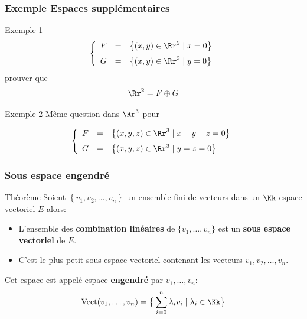 \documentclass[dvipsnames]{beamer}
\begin{document}
\begin{frame}[<+->]
  \frametitle{Exemple Espaces supplémentaires}

  \begin{block}{Exemple 1}
    \small
   \begin{equation*}
     \left\{\begin{array}{lll}
         F & = & \left\{(x,y) \in \Rr^2\;|\; x=0\right\}\\[6pt]
         G & = & \left\{(x,y) \in \Rr^2\;|\; y=0\right\}
     \end{array}\right.
   \end{equation*} 
   prouver que $$ \Rr^2 = F \oplus G$$
  \end{block}
 
\begin{block}{Exemple 2}
  \small
  Même question dans $\Rr^3$ pour 

   \begin{equation*}
     \left\{\begin{array}{lll}
         F & = & \left\{(x,y,z) \in \Rr^3\;|\; x-y-z=0\right\}\\[6pt]
         G & = & \left\{(x,y,z) \in \Rr^3\;|\; y=z=0\right\}
     \end{array}\right.
   \end{equation*} 
\end{block}
\end{frame}
\begin{frame}[<+->]
  \frametitle{Sous espace engendré}
 \begin{block}{Théorème}
   \small
   Soient $\left\{v_1,v_2,\ldots,v_n\right\}$ un ensemble fini de vecteurs dans
   un $\Kk$-espace vectoriel $E$ alors:

   \begin{itemize}
     \item L'ensemble des \textbf{\alert{combination linéaires}} de
       $\{v_1,\ldots,v_n\}$ est un \textbf{sous espace vectoriel} de $E$.\\[4pt]
     \item C'est \alert{le plus petit} sous espace vectoriel contenant les vecteurs
       $v_1,v_2,\ldots, v_n$.
   \end{itemize}
 \end{block} 

 Cet espace est appelé espace \textbf{engendré}  par $v_1,\ldots,v_n$:
 \begin{equation}
   \text{Vect}(v_1,\ldots,v_n) = \big\{ \sum_{i=0}^n \lambda_i v_i\;|\; \lambda_i \in
   \Kk\big\}
 \end{equation}
\end{frame}
\end{document}
